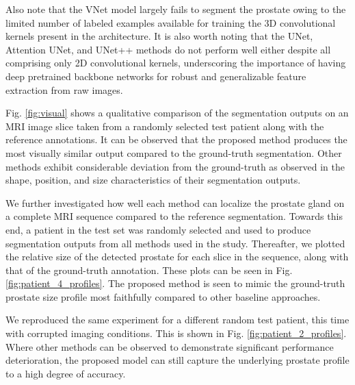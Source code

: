 \documentclass[journal]{IEEEtran}
\begin{document}
Also note that the VNet model largely fails to segment the prostate owing to the limited number of labeled examples available for training the 3D convolutional kernels present in the architecture. It is also worth noting that the UNet, Attention UNet, and UNet++ methods do not perform well either despite all comprising only 2D convolutional kernels, underscoring the importance of having deep pretrained backbone networks for robust and generalizable feature extraction from raw images.

Fig. \ref{fig:visual} shows a qualitative comparison of the segmentation outputs on an MRI image slice taken from a randomly selected test patient along with the reference annotations. It can be observed that the proposed method produces the most visually similar output compared to the ground-truth segmentation. Other methods exhibit considerable deviation from the ground-truth as observed in the shape, position, and size characteristics of their segmentation outputs. 

We further investigated how well each method can localize the prostate gland on a complete MRI sequence compared to the reference segmentation. Towards this end, a patient in the test set was randomly selected and used to produce segmentation outputs from all methods used in the study. Thereafter, we plotted the relative size of the detected prostate for each slice in the sequence, along with that of the ground-truth annotation. These plots can be seen in Fig. \ref{fig:patient_4_profiles}. The proposed method is seen to mimic the ground-truth prostate size profile most faithfully compared to other baseline approaches. 

We reproduced the same experiment for a different random test patient, this time with corrupted imaging conditions. This is shown in Fig. \ref{fig:patient_2_profiles}. Where other methods can be observed to demonstrate significant performance deterioration, the proposed model can still capture the underlying prostate profile to a high degree of accuracy. 
\end{document}
